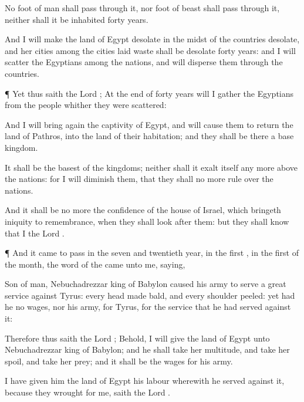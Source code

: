 {No
foot of
man shall pass
through it, nor
foot of
beast shall pass
through it, neither shall it be
inhabited
forty
years.

And I will
make the
land of
Egypt
desolate in the
midst of the
countries
{}
desolate, and her
cities
among the
cities
{} laid
waste shall be
desolate
forty
years: and I will
scatter the
Egyptians among the
nations, and will
disperse them through the
countries.


\par }{\PP {}¶ Yet thus
saith the
Lord
{}; At the
end of
forty
years will I
gather the
Egyptians from the
people whither they were
scattered:

And I will bring
again the
captivity of
Egypt, and will cause them to
return
{} the
land of
Pathros, into the
land of their
habitation; and they shall be there a
base
kingdom.

It shall be the
basest of the
kingdoms; neither shall it
exalt itself any more above the
nations: for I will
diminish them, that they shall no more
rule over the
nations.

And it shall be no more the
confidence of the
house of
Israel, which
bringeth
{}
iniquity to
remembrance, when they shall
look
after them: but they shall
know that I
{} the
Lord
{}.


\par }{\PP {}¶ And it came to pass in the
seven and
twentieth
year, in the
first
{}, in the
first
{} of the
month, the
word of the
{} came unto me,
saying,

Son of
man,
Nebuchadrezzar
king of
Babylon
caused his
army to
serve a
great
service against
Tyrus: every
head
{} made
bald, and every
shoulder
{}
peeled: yet had he no
wages, nor his
army, for
Tyrus, for the
service that he had
served against it:

Therefore thus
saith the
Lord
{}; Behold, I will
give the
land of
Egypt unto
Nebuchadrezzar
king of
Babylon; and he shall
take her
multitude, and
take her
spoil, and
take her
prey; and it shall be the
wages for his
army.

I have
given him the
land of
Egypt
{} his
labour wherewith he
served against it, because they
wrought for me,
saith the
Lord
{}.


}
